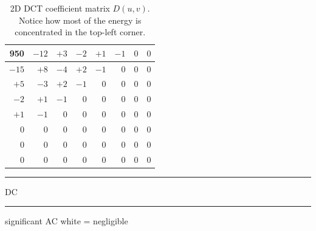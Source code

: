 \begin{table}[H]
\centering
\caption{2D DCT coefficient matrix $D(u,v)$. Notice how most of the energy is concentrated in the top-left corner.}
\label{tab:dct}
\setlength{\tabcolsep}{4pt}
\renewcommand{\arraystretch}{1.2}

\begin{tabular}{|r|r|r|r|r|r|r|r|}
\hline
\cellcolor{yellow!25}\textbf{950} & 
\cellcolor{blue!15}$-12$ &
\cellcolor{blue!15}$+3$ & 
$-2$ & $+1$ & $-1$ & $0$ & $0$ \\
\hline
\cellcolor{blue!15}$-15$ & 
\cellcolor{blue!15}$+8$ & 
$-4$ & $+2$ & $-1$ & $0$ & $0$ & $0$ \\
\hline
$+5$ & $-3$ & $+2$ & $-1$ & $0$ & $0$ & $0$ & $0$ \\
\hline
$-2$ & $+1$ & $-1$ & $0$ & $0$ & $0$ & $0$ & $0$ \\
\hline
$+1$ & $-1$ & $0$ & $0$ & $0$ & $0$ & $0$ & $0$ \\
\hline
$0$ & $0$ & $0$ & $0$ & $0$ & $0$ & $0$ & $0$ \\
\hline
$0$ & $0$ & $0$ & $0$ & $0$ & $0$ & $0$ & $0$ \\
\hline
$0$ & $0$ & $0$ & $0$ & $0$ & $0$ & $0$ & $0$ \\
\hline
\end{tabular}

\vspace{4pt}
{\small
\textcolor{yellow!60!black}{\rule{10pt}{8pt}} DC \quad
\textcolor{blue!60!black}{\rule{10pt}{8pt}} significant AC \quad
white = negligible}
\end{table}


